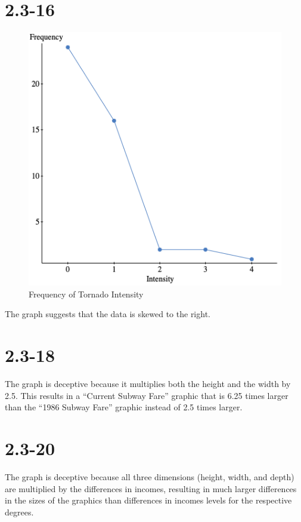 \documentclass[12pt]{article}
\newcommand{\chapter}{2.3}
\newcommand{\problem}[1]{\vspace{5ex}\section*{\chapter-#1}}
\begin{document}
\pagebreak
\problem{16}
\begin{figure}[ht]
  \centering
  \includegraphics[width=12cm]{assets/tornado-intensity.png}
  \caption{Frequency of Tornado Intensity}
\end{figure}

The graph suggests that the data is skewed to the right.


\problem{18}
The graph is deceptive because it multiplies both the height and the width by 2.5. This results in a  ``Current Subway Fare'' graphic that is 6.25 times larger than the ``1986 Subway Fare'' graphic instead of 2.5 times larger.


\problem{20}
The graph is deceptive because all three dimensions (height, width, and depth) are multiplied by the differences in incomes, resulting in much larger differences in the sizes of the graphics than differences in incomes levels for the respective degrees.
\end{document}
